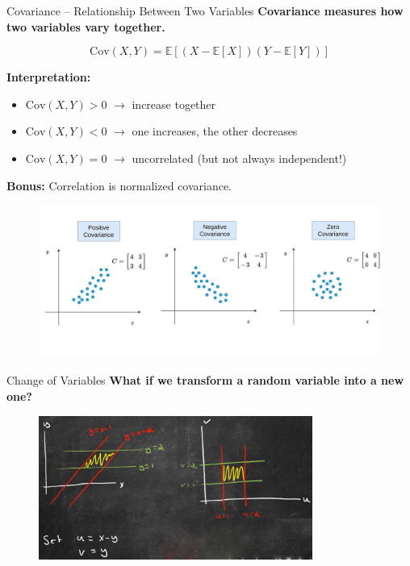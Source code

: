 \documentclass[handout,aspectratio=169]{beamer}
\begin{document}
\begin{frame}{Covariance – Relationship Between Two Variables}
  \textbf{Covariance measures how two variables vary together.}

  \vspace{1em}
  \[
    \text{Cov}(X, Y) = \mathbb{E}[(X - \mathbb{E}[X])(Y - \mathbb{E}[Y])]
  \]

  \textbf{Interpretation:}
  \begin{itemize}
    \item $\text{Cov}(X, Y) > 0$ $\rightarrow$ increase together
    \item $\text{Cov}(X, Y) < 0$ $\rightarrow$ one increases, the other decreases
    \item $\text{Cov}(X, Y) = 0$ $\rightarrow$ uncorrelated (but not always independent!)
  \end{itemize}

  \vspace{1em}
  \textbf{Bonus:} Correlation is normalized covariance.
\end{frame}

\begin{frame}[plain]
	\begin{figure}[htbp]
		\centering
		\includegraphics[width=\textwidth]{figs/covariance.jpg}
	\end{figure}
\end{frame}

\begin{frame}{Change of Variables}
  \textbf{What if we transform a random variable into a new one?}
  \vspace{1em}
  \begin{figure}[htbp]
		\centering
		\includegraphics[width=0.8\textwidth]{figs/change_of_variables.png}
	\end{figure}
  
\end{frame}
\end{document}

